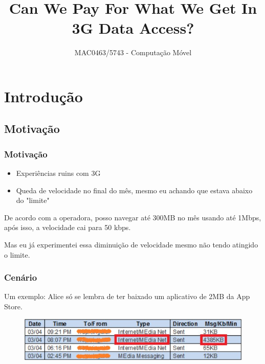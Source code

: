 \documentclass[brazil]{beamer}
\title{Can We Pay For What We Get In 3G Data Access?}
\author{MAC0463/5743 - Computação Móvel}
\date{}
\begin{document}
\frame{\titlepage}

\section{Introdução}



\subsection{Motivação}

\begin{frame}[fragile]
    \frametitle{Motivação}
    \begin{itemize}
        \item Experiências ruins com 3G
        \item Queda de velocidade no final do mês, mesmo eu achando que estava abaixo do "limite"
    \end{itemize}
\end{frame}

\begin{frame}[fragile]
    De acordo com a operadora, posso navegar até 300MB no mês usando até 1Mbps, após isso, a velocidade cai
    para 50 kbps.

    \pause
    \vspace{0.4cm}
    Mas eu já experimentei essa diminuição de velocidade mesmo não tendo atingido o limite.
\end{frame}

\begin{frame}[fragile]
    \frametitle{Cenário}
    Um exemplo: Alice só se lembra de ter baixado um aplicativo de 2MB da App Store.

    \begin{figure}
    \begin{center}
        \includegraphics[scale=0.5]{images/contaAlice.jpg}
    \end{center}
    \end{figure}
\end{frame}
\end{document}
